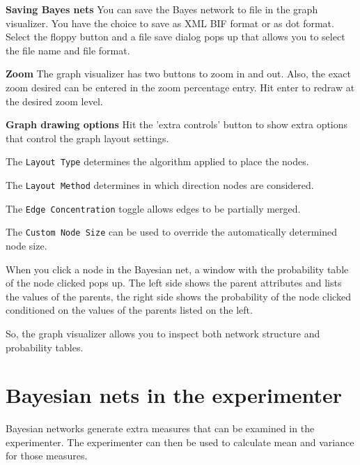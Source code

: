\documentclass[a4paper]{article}
\begin{document}
{\bf Saving Bayes nets} You can save the Bayes network to file in the graph visualizer.
You have the choice to save as XML BIF format or as dot format. Select the floppy button
and a file save dialog pops up that allows you to select the file name and file format.

{\bf Zoom} The graph visualizer has two buttons to zoom in and out. Also, the exact zoom
desired can be entered in the zoom percentage entry. Hit enter to redraw at the desired zoom
level.

{\bf Graph drawing options} Hit the 'extra controls' button to show extra options that
control the graph layout settings.

\begin{center}
\end{center}

The {\tt Layout Type} determines the algorithm applied to place the nodes.

The {\tt Layout Method} determines in which direction nodes are considered.

The {\tt Edge Concentration} toggle allows edges to be partially merged.

The {\tt Custom Node Size} can be used to override the automatically determined node size.

When you click a node in the Bayesian net, a window with the probability table of the node 
clicked pops up. The left side shows the parent attributes and lists the values of the
parents, the right side shows the probability of the node clicked conditioned on the 
values of the parents listed on the left.

\begin{center}
\end{center}

So, the graph visualizer allows you to inspect both network structure and probability tables. 

\section{Bayesian nets in the experimenter}

Bayesian networks generate extra measures that can be examined in the experimenter.
The experimenter can then be used to calculate mean and variance for those measures.
\end{document}
